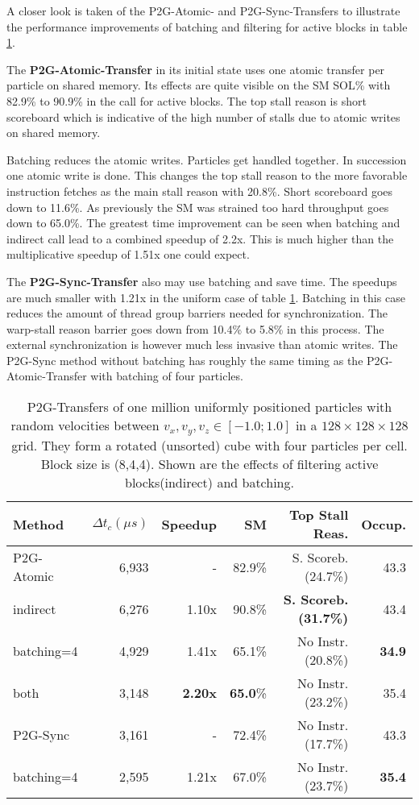 \documentclass[m,times]{cgMA}
\begin{document}
A closer look is taken of the P2G-Atomic- and P2G-Sync-Transfers to illustrate the performance improvements of batching and filtering for active blocks in table \ref{table:p2g_optim}.

The \textbf{P2G-Atomic-Transfer} in its initial state uses one atomic transfer per particle on shared memory. Its effects are quite visible on the SM SOL\% with 82.9\% to 90.9\% in the call for active blocks. The top stall reason is short scoreboard which is indicative of the high number of stalls due to atomic writes on shared memory.

Batching reduces the atomic writes. Particles get handled together. In succession one atomic write is done. This changes the top stall reason to the more favorable instruction fetches as the main stall reason with 20.8\%. Short scoreboard goes down to 11.6\%. As previously the SM was strained too hard throughput goes down to 65.0\%. The greatest time improvement can be seen when batching and indirect call lead to a combined speedup of 2.2x. This is much higher than the multiplicative speedup of 1.51x one could expect.

The \textbf{P2G-Sync-Transfer} also may use batching and save time. The speedups are much smaller with 1.21x in the uniform case of table \ref{table:p2g_optim}. Batching in this case reduces the amount of thread group barriers needed for synchronization. The warp-stall reason barrier goes down from 10.4\% to 5.8\% in this process. The external synchronization is however much less invasive than atomic writes. The P2G-Sync method without batching has roughly the same timing as the P2G-Atomic-Transfer with batching of four particles.
\begin{table}[htpb]
  \begin{tabular}{ | l | r | r | r | r | r |}    \hline
    Method                 &  $\Delta t_c(\mu s)$ & Speedup &SM    & Top Stall Reas.  & Occup.\\\hline
    P2G-Atomic		   &    6,933             & -       &82.9\%&S. Scoreb.(24.7\%)& 43.3\\\hline
    indirect		   &    6,276             & 1.10x   &90.8\%&\textbf{S. Scoreb.(31.7\%)} & 43.4\\\hline
    batching=4           &    4,929             & 1.41x   &65.1\%&No Instr.(20.8\%)& \textbf{34.9}\\\hline
    both                   &    3,148             & \textbf{2.20x}   &\textbf{65.0}\%&No Instr.(23.2\%) & 35.4\\\hline
    \hline
    P2G-Sync     &    3,161             & -       &72.4\%&No Instr.(17.7\%) & 43.3\\\hline
    batching=4             &    2,595             & 1.21x   &67.0\%&No Instr.(23.7\%) & \textbf{35.4}\\\hline
 \end{tabular}
 \caption{P2G-Transfers of one million uniformly positioned particles with random velocities between $v_x,v_y,v_z \in [-1.0;1.0]$ in a $128\times 128\times128$ grid. They form a rotated (unsorted) cube with four particles per cell. Block size is (8,4,4). Shown are the effects of filtering active blocks(indirect) and batching.}\label{table:p2g_optim}
\end{table}
\end{document}

